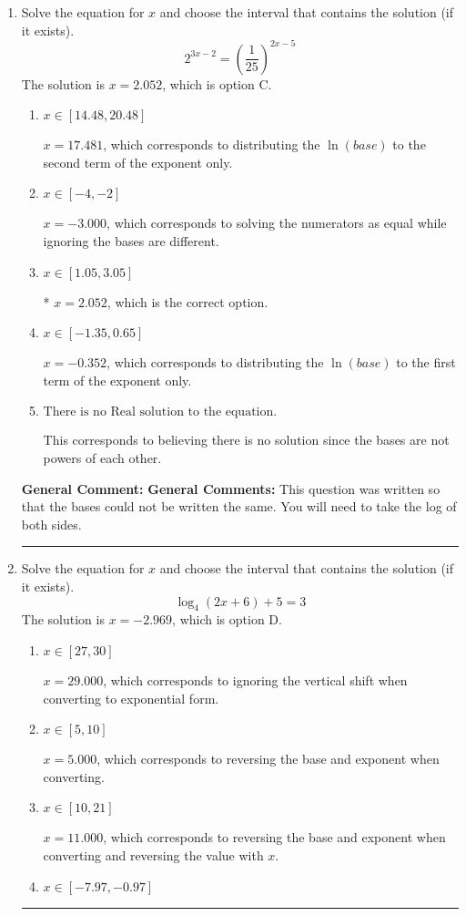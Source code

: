 \documentclass{extbook}[14pt]
\newcommand{\litem}[1]{\item #1

\rule{\textwidth}{0.4pt}}
\begin{document}
\begin{enumerate}\litem{
Solve the equation for $x$ and choose the interval that contains the solution (if it exists).
\[ 2^{3x-2} = \left(\frac{1}{25}\right)^{2x-5} \]The solution is \( x = 2.052 \), which is option C.\begin{enumerate}[label=\Alph*.]
\item \( x \in [14.48, 20.48] \)

$x = 17.481$, which corresponds to distributing the $\ln(base)$ to the second term of the exponent only.
\item \( x \in [-4, -2] \)

$x = -3.000$, which corresponds to solving the numerators as equal while ignoring the bases are different.
\item \( x \in [1.05, 3.05] \)

* $x = 2.052$, which is the correct option.
\item \( x \in [-1.35, 0.65] \)

$x = -0.352$, which corresponds to distributing the $\ln(base)$ to the first term of the exponent only.
\item \( \text{There is no Real solution to the equation.} \)

This corresponds to believing there is no solution since the bases are not powers of each other.
\end{enumerate}

\textbf{General Comment:} \textbf{General Comments:} This question was written so that the bases could not be written the same. You will need to take the log of both sides.
}
\litem{
Solve the equation for $x$ and choose the interval that contains the solution (if it exists).
\[ \log_{4}{(2x+6)}+5 = 3 \]The solution is \( x = -2.969 \), which is option D.\begin{enumerate}[label=\Alph*.]
\item \( x \in [27, 30] \)

$x = 29.000$, which corresponds to ignoring the vertical shift when converting to exponential form.
\item \( x \in [5, 10] \)

$x = 5.000$, which corresponds to reversing the base and exponent when converting.
\item \( x \in [10, 21] \)

$x = 11.000$, which corresponds to reversing the base and exponent when converting and reversing the value with $x$.
\item \( x \in [-7.97, -0.97] \)


\end{enumerate}}
\end{enumerate}
\end{document}
